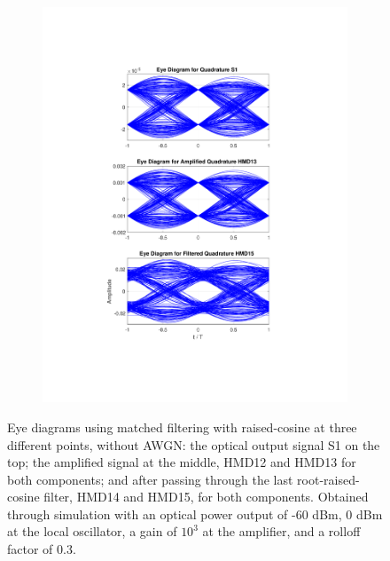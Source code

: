 \begin{figure}[H]
\begin{subfigure}{.45\textwidth}
		\includegraphics[clip, trim=5cm 4cm 5cm 4cm,
			width=\textwidth]{./sdf/m_qam_system/figures/eyes/q_nn_p_60_03_rc.pdf}
	\end{subfigure}
	
	\caption{Eye diagrams using matched filtering with raised-cosine at
		three different points, without AWGN: the optical output signal S1 on the top;
		the amplified signal at the middle, HMD12 and HMD13 for both components; and
		after passing through the last root-raised-cosine filter, HMD14 and HMD15, for
		both components. Obtained through simulation with an optical power output of
		-60 dBm, 0 dBm at the local oscillator, a gain of $10^3$ at the amplifier, and
		a rolloff factor of 0.3.\label{fig:eyes_nn_rc_03}}
	
\end{figure}



